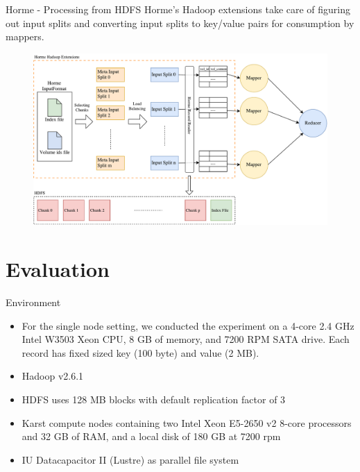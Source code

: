 \documentclass[newPxFont]{beamer}
\begin{document}
\begin{frame}[c]{Horme - Processing from HDFS}
  Horme's Hadoop extensions take care of figuring out input splits and converting input splits to key/value pairs for consumption by mappers.
  \begin{figure}[t]
  \includegraphics[scale=0.3]{horme-hdfs}
  \centering
\end{figure}
\end{frame}

\section{Evaluation}

\begin{frame}[c]{Environment}
\begin{itemize}
  \item For the single node setting, we conducted the experiment on a 4-core 2.4 GHz Intel W3503 Xeon CPU, 8 GB of memory, and 7200 RPM SATA drive. Each record has fixed sized key (100 byte) and value (2 MB).
  \item Hadoop v2.6.1
  \item HDFS uses 128 MB blocks with default replication factor of 3
  \item Karst compute nodes containing two Intel Xeon E5-2650 v2 8-core processors and 32 GB of RAM, and a local disk of 180 GB at 7200 rpm
  \item IU Datacapacitor II (Lustre) as parallel file system
\end{itemize}
\end{frame}
\end{document}
